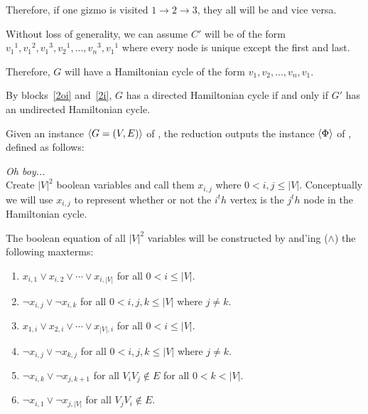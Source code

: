 \documentclass[11pt]{article}
\begin{document}
\begin{problems}
\begin{longFormProof}
\begin{block}[2i]
      \step Therefore, if one gizmo is visited $1\rightarrow2\rightarrow3$, they all will be and vice versa.

      \step Without loss of generality, we can assume $C'$ will be of the form ${v_1}^1, {v_1}^2, {v_1}^3, {v_2}^1, ..., {v_n}^3, {v_1}^1$ where every node is unique except the first and last.

      \step Therefore, $G$ will have a Hamiltonian cycle of the form $v_1, v_2, ..., v_n, v_1$.

    \end{block} 
    \step By blocks~\ref{2oi} and~\ref{2i},
    $G$ has a directed Hamiltonian cycle
    if and only if $G'$ has an undirected Hamiltonian cycle.
  \end{longFormProof}


  \newpage
  \problem %

  Given an instance $\langle G=(V,E) \rangle$ of ,
  the reduction outputs the instance $\langle \Phi \rangle$ of , defined as follows:
  
  \lineacross 
  \textit{Oh boy...}\\

  Create $|V|^2$ boolean variables and call them $x_{i,j}$ where $0 < i, j \leq |V|$. Conceptually we will use $x_{i,j}$ to represent whether or not the $i^th$ vertex is the $j^th$ node in the Hamiltonian cycle.

  The boolean equation of all $|V|^2$ variables will be constructed by and'ing ($\land$) the following maxterms:

  \begin{enumerate}
    \item $x_{i,1} \lor x_{i,2} \lor\cdots\lor x_{i,|V|}$ for all $0 < i \leq |V|$.
    \item $\neg x_{i,j} \lor \neg x_{i,k}$ for all $0 < i, j, k \leq |V|$ where $j \neq k$.
    \item $x_{1,i} \lor x_{2, i} \lor\cdots\lor x_{|V|, i}$ for all $0 < i \leq |V|$.
    \item $\neg x_{i,j} \lor \neg x_{k,j}$ for all $0 < i, j, k \leq |V|$ where $j \neq k$.
    \item $\neg x_{i,k} \lor \neg x_{j,k+1}$ for all $V_iV_j \notin E$ for all  $0 < k < |V|$.
    \item $\neg x_{i,1} \lor \neg x_{j,|V|}$ for all $V_jV_i \notin E$.
  \end{enumerate}
  \lineacross 


\end{problems}
\end{document}
